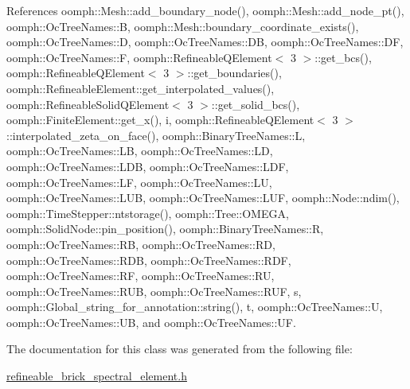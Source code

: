 References oomph\+::\+Mesh\+::add\+\_\+boundary\+\_\+node(), oomph\+::\+Mesh\+::add\+\_\+node\+\_\+pt(), oomph\+::\+Oc\+Tree\+Names\+::B, oomph\+::\+Mesh\+::boundary\+\_\+coordinate\+\_\+exists(), oomph\+::\+Oc\+Tree\+Names\+::D, oomph\+::\+Oc\+Tree\+Names\+::\+DB, oomph\+::\+Oc\+Tree\+Names\+::\+DF, oomph\+::\+Oc\+Tree\+Names\+::F, oomph\+::\+Refineable\+Q\+Element$<$ 3 $>$\+::get\+\_\+bcs(), oomph\+::\+Refineable\+Q\+Element$<$ 3 $>$\+::get\+\_\+boundaries(), oomph\+::\+Refineable\+Element\+::get\+\_\+interpolated\+\_\+values(), oomph\+::\+Refineable\+Solid\+Q\+Element$<$ 3 $>$\+::get\+\_\+solid\+\_\+bcs(), oomph\+::\+Finite\+Element\+::get\+\_\+x(), i, oomph\+::\+Refineable\+Q\+Element$<$ 3 $>$\+::interpolated\+\_\+zeta\+\_\+on\+\_\+face(), oomph\+::\+Binary\+Tree\+Names\+::L, oomph\+::\+Oc\+Tree\+Names\+::\+LB, oomph\+::\+Oc\+Tree\+Names\+::\+LD, oomph\+::\+Oc\+Tree\+Names\+::\+L\+DB, oomph\+::\+Oc\+Tree\+Names\+::\+L\+DF, oomph\+::\+Oc\+Tree\+Names\+::\+LF, oomph\+::\+Oc\+Tree\+Names\+::\+LU, oomph\+::\+Oc\+Tree\+Names\+::\+L\+UB, oomph\+::\+Oc\+Tree\+Names\+::\+L\+UF, oomph\+::\+Node\+::ndim(), oomph\+::\+Time\+Stepper\+::ntstorage(), oomph\+::\+Tree\+::\+O\+M\+E\+GA, oomph\+::\+Solid\+Node\+::pin\+\_\+position(), oomph\+::\+Binary\+Tree\+Names\+::R, oomph\+::\+Oc\+Tree\+Names\+::\+RB, oomph\+::\+Oc\+Tree\+Names\+::\+RD, oomph\+::\+Oc\+Tree\+Names\+::\+R\+DB, oomph\+::\+Oc\+Tree\+Names\+::\+R\+DF, oomph\+::\+Oc\+Tree\+Names\+::\+RF, oomph\+::\+Oc\+Tree\+Names\+::\+RU, oomph\+::\+Oc\+Tree\+Names\+::\+R\+UB, oomph\+::\+Oc\+Tree\+Names\+::\+R\+UF, s, oomph\+::\+Global\+\_\+string\+\_\+for\+\_\+annotation\+::string(), t, oomph\+::\+Oc\+Tree\+Names\+::U, oomph\+::\+Oc\+Tree\+Names\+::\+UB, and oomph\+::\+Oc\+Tree\+Names\+::\+UF.



The documentation for this class was generated from the following file\+:\begin{DoxyCompactItemize}
\item 
\hyperlink{refineable__brick__spectral__element_8h}{refineable\+\_\+brick\+\_\+spectral\+\_\+element.\+h}\end{DoxyCompactItemize}
